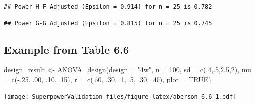 \documentclass[
]{book}
\newenvironment{Shaded}{\begin{snugshade}}{\end{snugshade}}
\newcommand{\AttributeTok}[1]{\textcolor[rgb]{0.77,0.63,0.00}{#1}}
\newcommand{\ConstantTok}[1]{\textcolor[rgb]{0.00,0.00,0.00}{#1}}
\newcommand{\DecValTok}[1]{\textcolor[rgb]{0.00,0.00,0.81}{#1}}
\newcommand{\FloatTok}[1]{\textcolor[rgb]{0.00,0.00,0.81}{#1}}
\newcommand{\FunctionTok}[1]{\textcolor[rgb]{0.00,0.00,0.00}{#1}}
\newcommand{\NormalTok}[1]{#1}
\newcommand{\OtherTok}[1]{\textcolor[rgb]{0.56,0.35,0.01}{#1}}
\newcommand{\SpecialCharTok}[1]{\textcolor[rgb]{0.00,0.00,0.00}{#1}}
\newcommand{\StringTok}[1]{\textcolor[rgb]{0.31,0.60,0.02}{#1}}
\begin{document}
\begin{verbatim}
## Power H-F Adjusted (Epsilon = 0.914) for n = 25 is 0.782
\end{verbatim}

\begin{verbatim}
## Power G-G Adjusted (Epsilon = 0.815) for n = 25 is 0.745
\end{verbatim}

\hypertarget{example-from-table-6.6}{%
\subsection{Example from Table 6.6}\label{example-from-table-6.6}}

\begin{Shaded}
\begin{Highlighting}[]
\NormalTok{design\_result }\OtherTok{\textless{}{-}} \FunctionTok{ANOVA\_design}\NormalTok{(}\AttributeTok{design =} \StringTok{"4w"}\NormalTok{,}
                              \AttributeTok{n =} \DecValTok{100}\NormalTok{,}
                              \AttributeTok{sd =} \FunctionTok{c}\NormalTok{(.}\DecValTok{4}\NormalTok{,.}\DecValTok{5}\NormalTok{,}\FloatTok{2.5}\NormalTok{,}\DecValTok{2}\NormalTok{),}
                              \AttributeTok{mu =} \FunctionTok{c}\NormalTok{(}\SpecialCharTok{{-}}\NormalTok{.}\DecValTok{25}\NormalTok{, .}\DecValTok{00}\NormalTok{, .}\DecValTok{10}\NormalTok{, .}\DecValTok{15}\NormalTok{),}
                              \AttributeTok{r =} \FunctionTok{c}\NormalTok{(.}\DecValTok{50}\NormalTok{, }
\NormalTok{                                    .}\DecValTok{30}\NormalTok{,}
\NormalTok{                                    .}\DecValTok{1}\NormalTok{, }
\NormalTok{                                    .}\DecValTok{5}\NormalTok{,}
\NormalTok{                                    .}\DecValTok{30}\NormalTok{, }
\NormalTok{                                    .}\DecValTok{40}\NormalTok{),}
                              \AttributeTok{plot =} \ConstantTok{TRUE}\NormalTok{)}
\end{Highlighting}
\end{Shaded}

\texttt{[image: SuperpowerValidation\_files/figure-latex/aberson\_6.6-1.pdf]}

\begin{Shaded}
\end{Shaded}
\end{document}
